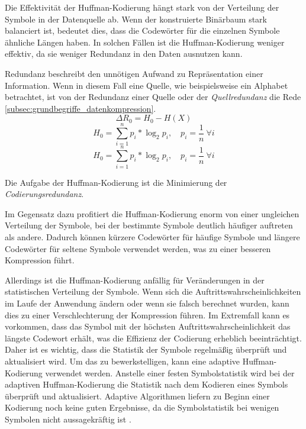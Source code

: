 Die Effektivität der Huffman-Kodierung hängt stark von der Verteilung der Symbole in der Datenquelle ab. 
Wenn der konstruierte Binärbaum stark balanciert ist, bedeutet dies, dass die Codewörter für die einzelnen Symbole ähnliche Längen haben. 
In solchen Fällen ist die Huffman-Kodierung weniger effektiv, da sie weniger Redundanz in den Daten ausnutzen kann.

Redundanz beschreibt den unnötigen Aufwand zu Repräsentation einer Information.
Wenn in diesem Fall eine Quelle, wie beispielsweise ein Alphabet betrachtet, ist von der Redundanz einer Quelle oder der \textit{Quellredundanz} die Rede \ref{subsec:grundbegriffe_datenkompression}.
\begin{equation*}
\Delta R_0 = H_0 - H(X)
\end{equation*}
\begin{equation*}
H_0 = \sum_{i=1}^{n} p_i * \log_2{p_i} , \quad p_i = \frac{1}{n} \ \forall i
\end{equation*}
\begin{equation*}
H_0 = \sum_{i=1}^{n} p_i * \log_2{p_i} , \quad p_i = \frac{1}{n} \ \forall i
\end{equation*}

Die Aufgabe der Huffman-Kodierung ist die Minimierung der \textit{Codierungsredundanz}.

Im Gegensatz dazu profitiert die Huffman-Kodierung enorm von einer ungleichen Verteilung der Symbole, bei der bestimmte Symbole deutlich häufiger auftreten als andere. 
Dadurch können kürzere Codewörter für häufige Symbole und längere Codewörter für seltene Symbole verwendet werden, was zu einer besseren Kompression führt.

Allerdings ist die Huffman-Kodierung anfällig für Veränderungen in der statistischen Verteilung der Symbole. 
Wenn sich die Auftrittswahrscheinlichkeiten im Laufe der Anwendung ändern oder wenn sie falsch berechnet wurden, kann dies zu einer Verschlechterung der Kompression führen. 
Im Extremfall kann es vorkommen, dass das Symbol mit der höchsten Auftrittswahrscheinlichkeit das längste Codewort erhält, was die Effizienz der Codierung erheblich beeinträchtigt. 
Daher ist es wichtig, dass die Statistik der Symbole regelmäßig überprüft und aktualisiert wird.
Um das zu bewerkstelligen, kann eine adaptive Huffman-Kodierung verwendet werden. 
Anstelle einer festen Symbolstatistik wird bei der adaptiven Huffman-Kodierung die Statistik nach dem Kodieren eines Symbols überprüft und aktualisiert. 
Adaptive Algorithmen liefern zu Beginn einer Kodierung noch keine guten Ergebnisse, da die Symbolstatistik bei wenigen Symbolen nicht aussagekräftig ist \cite{Jeon1998}.

